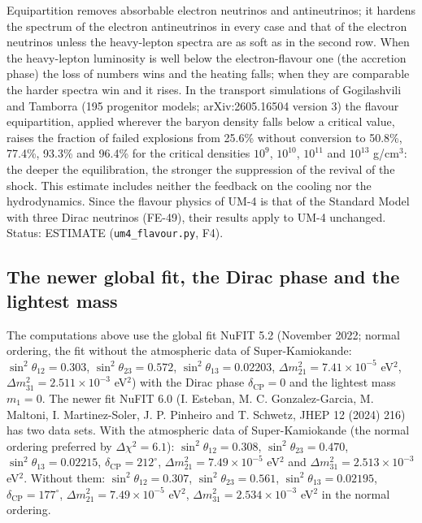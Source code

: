 \documentclass[
  10pt,
]{article}
\begin{document}
Equipartition removes absorbable electron neutrinos and antineutrinos;
it hardens the spectrum of the electron antineutrinos in every case and
that of the electron neutrinos unless the heavy-lepton spectra are as
soft as in the second row. When the heavy-lepton luminosity is well
below the electron-flavour one (the accretion phase) the loss of numbers
wins and the heating falls; when they are comparable the harder spectra
win and it rises. In the transport simulations of Gogilashvili and
Tamborra (195 progenitor models; arXiv:2605.16504 version 3) the flavour
equipartition, applied wherever the baryon density falls below a
critical value, raises the fraction of failed explosions from 25.6\%
without conversion to 50.8\%, 77.4\%, 93.3\% and 96.4\% for the critical
densities \(10^9\), \(10^{10}\), \(10^{11}\) and \(10^{13}\) g/cm\(^3\):
the deeper the equilibration, the stronger the suppression of the
revival of the shock. This estimate includes neither the feedback on the
cooling nor the hydrodynamics. Since the flavour physics of UM-4 is that
of the Standard Model with three Dirac neutrinos (FE-49), their results
apply to UM-4 unchanged. Status: ESTIMATE (\texttt{um4\_flavour.py},
F4).

\hypertarget{the-newer-global-fit-the-dirac-phase-and-the-lightest-mass}{%
\subsection{The newer global fit, the Dirac phase and the lightest
mass}\label{the-newer-global-fit-the-dirac-phase-and-the-lightest-mass}}

The computations above use the global fit NuFIT 5.2 (November 2022;
normal ordering, the fit without the atmospheric data of
Super-Kamiokande: \(\sin^2\theta_{12} = 0.303\),
\(\sin^2\theta_{23} = 0.572\), \(\sin^2\theta_{13} = 0.02203\),
\(\Delta m^2_{21} = 7.41\times10^{-5}\) eV\(^2\),
\(\Delta m^2_{31} = 2.511\times10^{-3}\) eV\(^2\)) with the Dirac phase
\(\delta_{\mathrm{CP}} = 0\) and the lightest mass \(m_1 = 0\). The
newer fit NuFIT 6.0 (I. Esteban, M. C. Gonzalez-Garcia, M. Maltoni, I.
Martinez-Soler, J. P. Pinheiro and T. Schwetz, JHEP 12 (2024) 216) has
two data sets. With the atmospheric data of Super-Kamiokande (the normal
ordering preferred by \(\Delta\chi^2 = 6.1\)):
\(\sin^2\theta_{12} = 0.308\), \(\sin^2\theta_{23} = 0.470\),
\(\sin^2\theta_{13} = 0.02215\), \(\delta_{\mathrm{CP}} = 212^\circ\),
\(\Delta m^2_{21} = 7.49\times10^{-5}\) eV\(^2\) and
\(\Delta m^2_{31} = 2.513\times10^{-3}\) eV\(^2\). Without them:
\(\sin^2\theta_{12} = 0.307\), \(\sin^2\theta_{23} = 0.561\),
\(\sin^2\theta_{13} = 0.02195\), \(\delta_{\mathrm{CP}} = 177^\circ\),
\(\Delta m^2_{21} = 7.49\times10^{-5}\) eV\(^2\),
\(\Delta m^2_{31} = 2.534\times10^{-3}\) eV\(^2\) in the normal
ordering.
\end{document}
